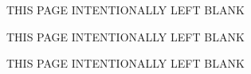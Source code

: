 \documentclass[twoside,leftblank,mitcopyright]{mengthesis}
\begin{document}
\clearpage
\hbox{}\par\vfill\centerline%
   {THIS PAGE INTENTIONALLY LEFT BLANK}%
   \vfill\newpage
   \thispagestyle{plain}
\clearpage

\tableofcontents

\clearpage
\hbox{}\par\vfill\centerline%
   {THIS PAGE INTENTIONALLY LEFT BLANK}%
   \vfill\newpage
   \thispagestyle{plain}
\clearpage

\listoffigures

\clearpage %
\listoftables

\clearpage
\hbox{}\par\vfill\centerline%
   {THIS PAGE INTENTIONALLY LEFT BLANK}%
   \vfill\newpage
   \thispagestyle{plain}
\clearpage





\acresetall %

















\clearpage
{} 

\renewcommand{\bibname}{References}  %

\begin{singlespace}

\end{singlespace}

\end{document}
